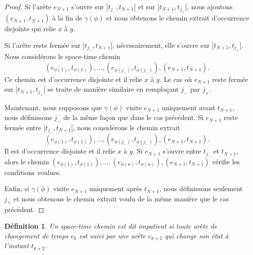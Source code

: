 \documentclass[titlepage,a4paper,12pt]{article}
\newcounter{def}
\newtheorem{impatient}[def]{Définition}
\begin{document}
\begin{proof}
Si l'arête $e_{N+1}$ s'ouvre sur $]t_{j_-},t_{N+1}[$ et sur $]t_{N+1},t_{j_+}[$, nous ajoutons $(e_{N+1},t_{N+1})$ à la fin de $\gamma(\phi)$ et nous obtenons le chemin extrait d'occurrence disjointe qui relie $x$ à $y$.

Si l'arête reste fermée sur $]t_{j_-},t_{N+1}[$, nécessairement, elle s'ouvre sur $]t_{N+1},t_{j_+}[$. Nous considérons le space-time chemin 
$$(e_{\phi(1)},t_{\phi(1)}), \dots, (e_{\phi(j_-)},t_{\phi(j_-)}),(e_{N+1},t_{N+1}).
$$
Ce chemin est d'occurrence disjointe et il relie $x$ à $y$.
Le cas où $e_{N+1}$ reste fermée sur $]t_{N+1},t_{j_+}[$ se traite de manière similaire en remplaçant $j_-$ par $j_+$.

Maintenant, nous supposons que $\gamma(\phi)$ visite $e_{N+1}$ uniquement avant $t_{N+1}$, nous définissons $j_-$ de la même façon que dans le cas précédent. Si $e_{N+1}$ reste fermée entre $]t_{j_-}, t_{N+1}[$, nous considérons le chemin extrait $$(e_{\phi(1)},t_{\phi(1)}),\dots, (e_{\phi(j_-)},t_{\phi(j_-)}),(e_{N+1},t_{N+1}).$$ Il est d'occurrence disjointe et il relie $x$ à $y$. Si $e_{N+1}$ s'ouvre entre $t_{j_-}$ et $t_{N+1}$, alors le chemin $(e_{\phi(1)},t_{\phi(1)}),\dots, (e_{\phi(n)},t_{\phi(n)}),(e_{N+1},t_{N+1})$ vérifie les conditions voulues.

Enfin, si $\gamma(\phi)$ visite $e_{N+1}$ uniquement après $t_{N+1}$, nous définissons seulement $j_+$ et nous obtenons le chemin extrait voulu de la même manière que le cas précédent.
\end{proof}

\begin{impatient}
Un space-time chemin est dit impatient si toute arête de changement de temps $e_k$ est suivi par une arête $e_{k+2}$ qui change son état à l'instant $t_{k+2}$.
\end{impatient}
\end{document}
